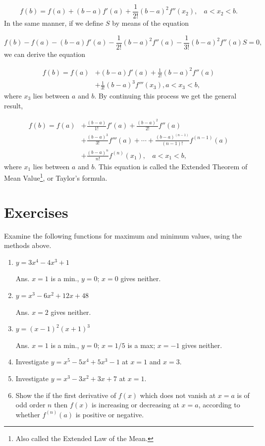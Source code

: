 \[
f(b) = f(a) + (b - a)f'(a) + \frac{1}{2!} (b - a)^2 f''(x_2),
\ \ \ \ a < x_2 < b.
\]
In the same manner, if we define $S$ by means of the equation

\[
f(b) -f(a) - (b - a) f'(a) 
- \frac{1}{2!} (b - a)^2 f''(a) 
- \frac{1}{3!}(b - a)^2 f''(a) S = 0,
\]
we can derive the equation

\begin{equation}
\begin{array}{ll} 
f(b) = f(a) & + (b - a)f'(a) + \frac{1}{2!} (b - a)^2 f''(a) \\ 
& + \frac{1}{3!} (b - a)^3 f'''(x_3), a < x_3 < b ,
\end{array}
\label{eqn:107-D}
\end{equation}
where $x_3$ lies between $a$ and $b$.
By continuing this process we get the general result,

\[
\begin{array}{ll} 
f(b) = f(a) & 
+ \frac{(b - a)}{1!}f'(a) + \frac{(b - a)^2}{2!}f''(a) \\ 
& + \frac{(b - a)^3}{3!}f'''(a) + \cdots 
+ \frac{(b - a)^{(n - 1)}}{(n - 1)!}f^{(n - 1)} (a) \\ 
& + \frac{(b - a)^n}{n!}f^{(n)} (x_1), \ \ \ \ a < x_1 < b, 
\end{array}
\]
where $x_1$ lies between $a$ and $b$. 
This equation %
is called the Extended Theorem of Mean Value\footnote{Also 
called the Extended Law of the Mean.}, or Taylor's formula.

\section{Exercises}

Examine the following functions for maximum and minimum values, 
using the methods above.

\begin{enumerate}
\item
$y=3x^4-4x^3+1$

Ans.
$x=1$ is a min., $y=0$; $x=0$ gives neither.

\item
$y=x^3-6x^2+12x+48$

Ans.
$x=2$ gives neither.

\item
$y=(x-1)^2(x+1)^3$

Ans.
$x=1$ is a min., $y=0$;
$x=1/5$ is a max;
$x=-1$ gives neither.


\item
Investigate $y=x^5-5x^4+5x^3-1$ at $x=1$ and $x=3$.

\item
Investigate $y=x^3-3x^2+3x+7$ at $x=1$.

\item
Show the if the first derivative of $f(x)$ which does not vanish at
$x=a$ is of odd order $n$ then $f(x)$ is increasing or decreasing at
$x=a$, according to whether $f^{(n)}(a)$ is positive or negative.


\end{enumerate}


